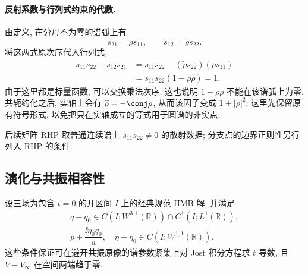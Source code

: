 \paragraph{反射系数与行列式约束的代数.}
由定义, 在分母不为零的谱弧上有
\[
s_{21}=\rho s_{11},\qquad s_{12}=\widetilde\rho s_{22}.
\]
将这两式原次序代入行列式,
\begin{align*}
s_{11}s_{22}-s_{12}s_{21}
&=s_{11}s_{22}-(\widetilde\rho s_{22})(\rho s_{11})\\
&=s_{11}s_{22}(1-\rho\widetilde\rho)=1.
\end{align*}
由于这里都是标量函数, 可以交换乘法次序.
这也说明 $1-\rho\widetilde\rho$ 不能在该谱弧上为零.
共轭约化之后, 实轴上会有
$\widetilde\rho=-\conj\rho$, 从而该因子变成
$1+|\rho|^2$; 这里先保留原有符号形式,
以免把只在实轴成立的等式用于圆谱的非实点.

后续矩阵 RHP 取普通连续谱上 $s_{11}s_{22}\ne0$ 的散射数据; 分支点的边界正则性另行列入 RHP 的条件.

\subsection{演化与共振相容性}
设三场为包含 $t=0$ 的开区间 $I$ 上的经典规范 HMB 解, 并满足
\begin{equation}\label{eq:evolution-regularity}
\begin{gathered}
q-q_0\in C(I;W^{3,1}(\mathbb R))\cap C^1(I;L^1(\mathbb R)),\\
p+\dfrac{\ii\eta_0q_0}{a},\quad\eta-\eta_0\in C(I;W^{1,1}(\mathbb R)).
\end{gathered}
\end{equation}
这些条件保证可在避开共振原像的谱参数紧集上对 Jost 积分方程求 $t$ 导数, 且 $V-V_\infty$ 在空间两端趋于零.

